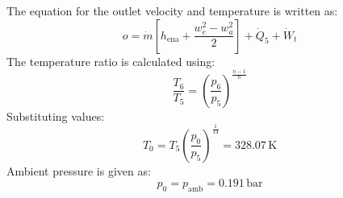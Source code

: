 The equation for the outlet velocity and temperature is written as:  
\[
o = \dot{m} \left[ h_{\text{ena}} + \frac{w_e^2 - w_a^2}{2} \right] + \dot{Q}_5 + \dot{W}_t
\]  
The temperature ratio is calculated using:  
\[
\frac{T_6}{T_5} = \left( \frac{p_6}{p_5} \right)^{\frac{n-1}{n}}
\]  
Substituting values:  
\[
T_0 = T_5 \left( \frac{p_0}{p_5} \right)^{\frac{1}{14}} = 328.07 \, \text{K}
\]  
Ambient pressure is given as:  
\[
p_0 = p_{\text{amb}} = 0.191 \, \text{bar}
\]